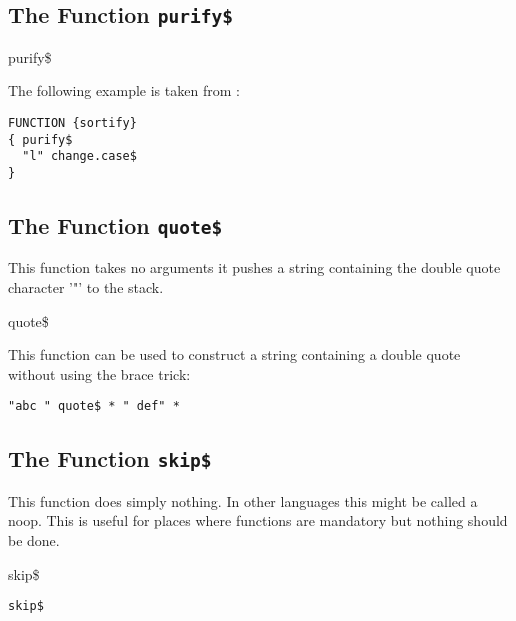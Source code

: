\subsection{The Function \texttt{purify\$}}%


\INCOMPLETE

\begin{BstFunction}{purify\$}
\end{BstFunction}

The following example is taken from :

\begin{lstlisting}[language=bst]
FUNCTION {sortify}
{ purify$
  "l" change.case$
}
\end{lstlisting}


\subsection{The Function \texttt{quote\$}}%

This function takes no arguments it pushes a string containing the
double quote character '"' to the stack.

\begin{BstFunction}{quote\$}
\end{BstFunction}

This function can be used to construct a string containing a double
quote without using the brace trick:

\begin{lstlisting}[language=bst]
  "abc " quote$ * " def" * 
\end{lstlisting}\fctIndex{*}


\subsection{The Function \texttt{skip\$}}%

This function does simply nothing. In other languages this might be
called a noop. This is useful for places where functions are
mandatory but nothing should be done.

\begin{BstFunction}{skip\$}
\end{BstFunction}

\begin{lstlisting}[language=bst]
  skip$
\end{lstlisting}


